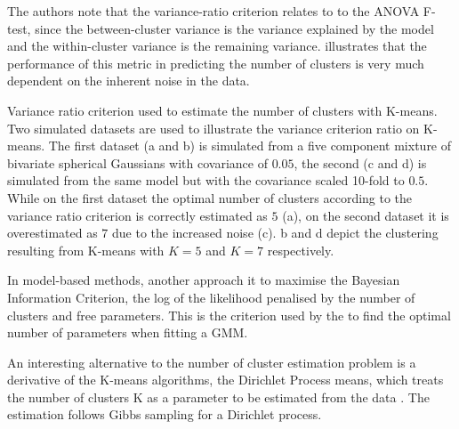 The authors note that the variance-ratio criterion relates to
to the \gls{ANOVA} F-test,
since the between-cluster variance is the variance explained by the model
and the within-cluster variance is the remaining variance.
 illustrates that the performance of this metric in predicting the number of clusters
is very much dependent on the inherent noise in the data.



{Variance ratio criterion used to estimate the number of clusters with K-means.}
{
  Two simulated datasets are used to illustrate the variance criterion ratio on K-means.
  The first dataset (a and b) is simulated from a five component mixture of bivariate spherical Gaussians with covariance of $0.05$,
  the second (c and d) is simulated from the same model but with the covariance scaled 10-fold to $0.5$.
  While on the first dataset the optimal number of clusters according to the variance ratio criterion is correctly estimated as $5$ (a),
  on the second dataset it is overestimated as $7$ due to the increased noise (c).
  b and d depict the clustering resulting from K-means with $K=5$ and $K=7$ respectively.
}


In model-based methods, another approach it to maximise the Bayesian Information Criterion, the log of the likelihood penalised by the number of clusters and free parameters.
This is the criterion used by the  to find the optimal number of parameters when fitting a \gls{GMM}.


An interesting alternative to the number of cluster estimation problem is a derivative of the K-means algorithms,
the Dirichlet Process means, which treats the number of clusters
K as a parameter to be estimated from the data \citep{Kulis:2011wj}.
The estimation follows Gibbs sampling for a Dirichlet process.

